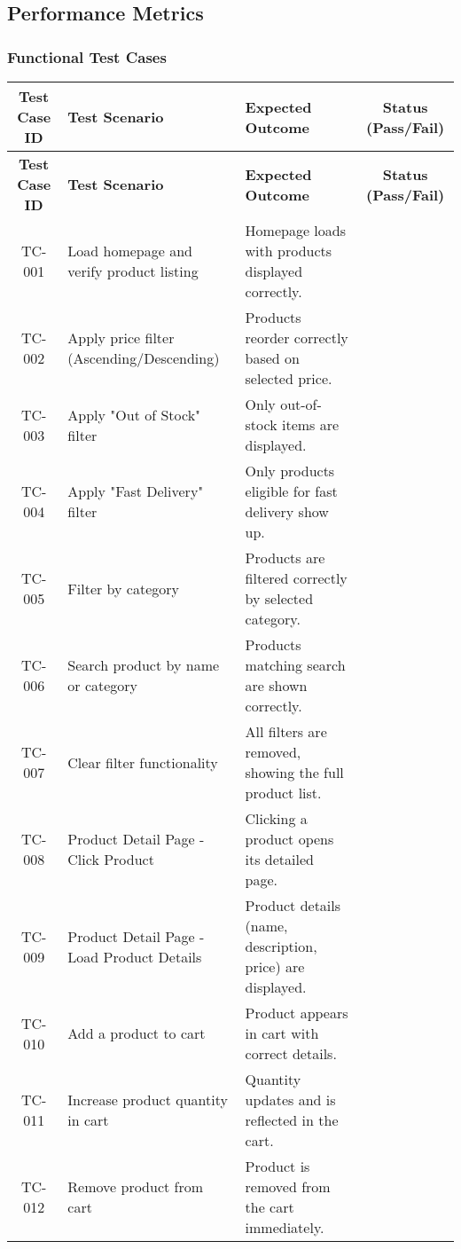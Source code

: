 \documentclass{llncs}
\begin{document}
\subsection{Performance Metrics}

\subsubsection{Functional Test Cases}

\begin{longtable}{|c|p{4.5cm}|p{4.5cm}|c|}
\hline
\textbf{Test Case ID} & \textbf{Test Scenario} & \textbf{Expected Outcome} & \textbf{Status (Pass/Fail)} \\ \hline
\endfirsthead
\hline
\textbf{Test Case ID} & \textbf{Test Scenario} & \textbf{Expected Outcome} & \textbf{Status (Pass/Fail)} \\ \hline
\endhead
TC-001 & Load homepage and verify product listing & Homepage loads with products displayed correctly. & \\ \hline
TC-002 & Apply price filter (Ascending/Descending) & Products reorder correctly based on selected price. & \\ \hline
TC-003 & Apply "Out of Stock" filter & Only out-of-stock items are displayed. & \\ \hline
TC-004 & Apply "Fast Delivery" filter & Only products eligible for fast delivery show up. & \\ \hline
TC-005 & Filter by category & Products are filtered correctly by selected category. & \\ \hline
TC-006 & Search product by name or category & Products matching search are shown correctly. & \\ \hline
TC-007 & Clear filter functionality & All filters are removed, showing the full product list. & \\ \hline
TC-008 & Product Detail Page - Click Product & Clicking a product opens its detailed page. & \\ \hline
TC-009 & Product Detail Page - Load Product Details & Product details (name, description, price) are displayed. & \\ \hline
TC-010 & Add a product to cart & Product appears in cart with correct details. & \\ \hline
TC-011 & Increase product quantity in cart & Quantity updates and is reflected in the cart. & \\ \hline
TC-012 & Remove product from cart & Product is removed from the cart immediately. & \\ \hline

\end{longtable}
\end{document}
